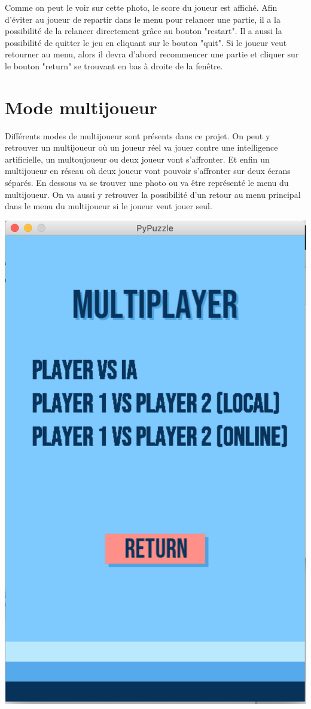 \documentclass[]{report}
\begin{document}
Comme on peut le voir sur cette photo, le score du joueur est affiché. Afin d'éviter au joueur de repartir dans le menu pour relancer une partie, il a la possibilité de la relancer directement grâce au bouton "restart". Il a aussi la possibilité de quitter le jeu en cliquant sur le bouton "quit". Si le joueur veut retourner au menu, alors il devra d'abord recommencer une partie et cliquer sur le bouton "return" se trouvant en bas à droite de la fenêtre. 

\section{Mode multijoueur}
Différents modes de multijoueur sont présents dans ce projet. On peut y retrouver un multijoueur où un joueur réel va jouer contre une intelligence artificielle, un multoujoueur ou deux joueur vont s'affronter. Et enfin un multijoueur en réseau où deux joueur vont pouvoir s'affronter sur deux écrans séparés. En dessous va se trouver une photo ou va être représenté le menu du multijoueur. On va aussi y retrouver la possibilité d'un retour au menu principal dans le menu du multijoueur si le joueur veut jouer seul.\\
\begin{center}
\includegraphics[scale=0.2]{images/menumulti.png}\\
\end{center}
\end{document}
